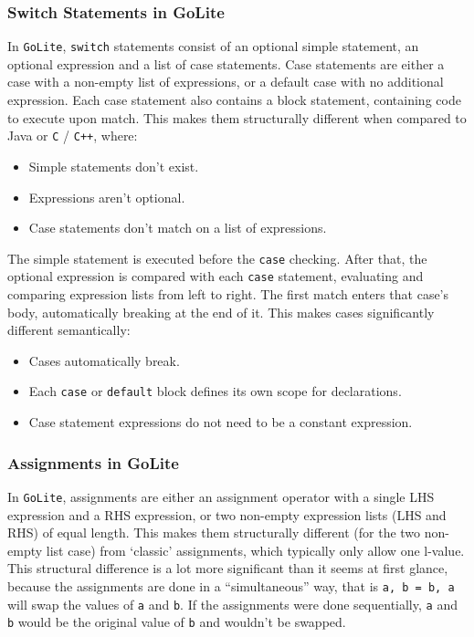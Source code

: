 \documentclass[11pt]{article}
\begin{document}
\subsubsection{Switch Statements in GoLite}
In \texttt{GoLite}, \texttt{switch} statements consist of an optional
simple statement, an optional expression and a list of case
statements. Case statements are either a case with a non-empty list of
expressions, or a default case with no additional expression.  Each
case statement also contains a block statement, containing code to
execute upon match. This makes them structurally different when
compared to Java or \texttt{C} / \texttt{C++}, where:
\begin{itemize}[noitemsep]
\item Simple statements don't exist.
\item Expressions aren't optional.
\item Case statements don't match on a list of expressions.
\end{itemize}
The simple statement is executed before the \texttt{case} checking.
After that, the optional expression is compared with each
\texttt{case} statement, evaluating and comparing expression lists
from left to right. The first match enters that case's body,
automatically breaking at the end of it. This makes cases
significantly different semantically:
\begin{itemize}[noitemsep]
\item Cases automatically break.
\item Each \texttt{case} or \texttt{default} block defines its own
  scope for declarations.
\item Case statement expressions do not need to be a constant
  expression.
\end{itemize}

\subsubsection{Assignments in GoLite}
In \texttt{GoLite}, assignments are either an assignment operator with
a single LHS expression and a RHS expression, or two non-empty
expression lists (LHS and RHS) of equal length. This makes them
structurally different (for the two non-empty list case) from
`classic' assignments, which typically only allow one l-value.  This
structural difference is a lot more significant than it seems at first
glance, because the assignments are done in a ``simultaneous'' way,
that is \texttt{a, b = b, a} will swap the values of \texttt{a} and
\texttt{b}. If the assignments were done sequentially, \texttt{a} and
\texttt{b} would be the original value of \texttt{b} and wouldn't be
swapped.
\end{document}
